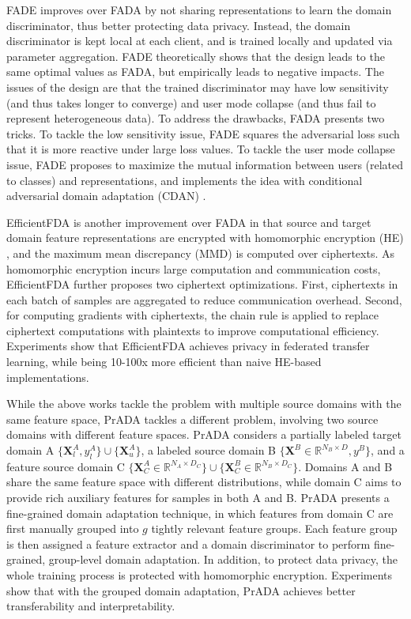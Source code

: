 \documentclass[11pt]{article}
\begin{document}
FADE \cite{hong2021federated} improves over FADA by not sharing representations to learn the domain discriminator, thus better protecting data privacy. Instead, the domain discriminator is kept local at each client, and is trained locally and updated via parameter aggregation. FADE theoretically shows that the design leads to the same optimal values as FADA, but empirically leads to negative impacts. The issues of the design are that the trained discriminator may have low sensitivity (and thus takes longer to converge) and user mode collapse (and thus fail to represent heterogeneous data). To address the drawbacks, FADA presents two tricks. To tackle the low sensitivity issue, FADE squares the adversarial loss such that it is more reactive under large loss values. To tackle the user mode collapse issue, FADE proposes to maximize the mutual information between users (related to classes) and representations, and implements the idea with conditional adversarial domain adaptation (CDAN) \cite{long2018conditional}.  

EfficientFDA \cite{kang2022communicational} is another improvement over FADA in that source and target domain feature representations are encrypted with homomorphic encryption (HE) \cite{aono2017privacy}, and the maximum mean discrepancy (MMD) \cite{long2015learning} is computed over ciphertexts. As homomorphic encryption incurs large computation and communication costs, EfficientFDA further proposes two ciphertext optimizations. First, ciphertexts in each batch of samples are aggregated to reduce communication overhead. Second, for computing gradients with ciphertexts, the chain rule is applied to replace ciphertext computations with plaintexts to improve computational efficiency. Experiments show that EfficientFDA achieves privacy in federated transfer learning, while being 10-100x more efficient than naive HE-based implementations.  

While the above works tackle the problem with multiple source domains with the same feature space, PrADA \cite{kang2022privacy} tackles a different problem, involving two source domains with different feature spaces. PrADA considers a partially labeled target domain A $\{\mathbf{X}_l^A, y_l^A\}\cup \{\mathbf{X}^A_u\}$, a labeled source domain B $\{\mathbf{X}^B\in\mathbb{R}^{N_B\times D}, y^B\}$, and a feature source domain C $\{\mathbf{X}^A_C\in \mathbb{R}^{N_A\times D_C}\}\cup \{\mathbf{X}^B_C\in\mathbb{R}^{N_B\times D_C}\}$. Domains A and B share the same feature space with different distributions, while domain C aims to provide rich auxiliary features for samples in both A and B. PrADA presents a fine-grained domain adaptation technique, in which features from domain C are first manually grouped into $g$ tightly relevant feature groups. Each feature group is then assigned a feature extractor and a domain discriminator to perform fine-grained, group-level domain adaptation. In addition, to protect data privacy, the whole training process is protected with homomorphic encryption. Experiments show that with the grouped domain adaptation, PrADA achieves better transferability and interpretability. 
\end{document}
